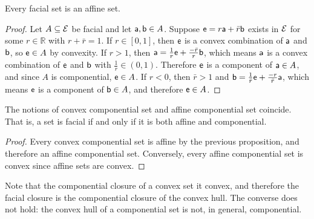 \begin{mathSection}
	
	\begin{prop}
		Every facial set is an affine set.
	\end{prop}
	
	\begin{proof}
		Let $A \subseteq \Ens$ be facial and let $\ens[a], \ens[b] \in A$. Suppose $\ens = r\ens[a] + \bar{r}\ens[b]$ exists in $\Ens$ for some $r \in \mathbb{R}$ with $r + \bar{r} = 1$. If $r \in [0,1]$, then $\ens$ is a convex combination of $\ens[a]$ and $\ens[b]$, so $\ens \in A$ by convexity. If $r > 1$, then $\ens[a] = \frac{1}{r}\ens + \frac{-\bar{r}}{r}\ens[b]$, which means $\ens[a]$ is a convex combination of $\ens$ and $\ens[b]$ with $\frac{1}{r} \in (0,1)$. Therefore $\ens$ is a component of $\ens[a] \in A$, and since $A$ is componential, $\ens \in A$. If $r < 0$, then $\bar{r} > 1$ and $\ens[b] = \frac{1}{\bar{r}}\ens + \frac{-r}{\bar{r}}\ens[a]$, which means $\ens$ is a component of $\ens[b] \in A$, and therefore $\ens \in A$.
	\end{proof}
	
	\begin{coro}
		The notions of convex componential set and affine componential set coincide. That is, a set is facial if and only if it is both affine and componential.
	\end{coro}
	
	\begin{proof}
		Every convex componential set is affine by the previous proposition, and therefore an affine componential set. Conversely, every affine componential set is convex since affine sets are convex.
	\end{proof}
\end{mathSection}

Note that the componential closure of a convex set it convex, and therefore the facial closure is the componential closure of the convex hull. The converse does not hold: the convex hull of a componential set is not, in general, componential.

